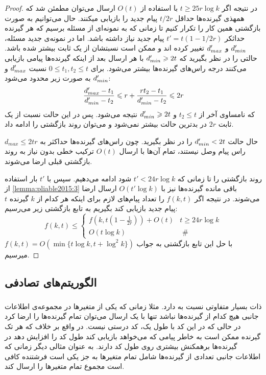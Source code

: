 \begin{proof}
	در نتیجه اگر
	$t \geq 25 r \log k$
	با استفاده از
	$O(t)$
	ارسال می‌توان مطمئن شد که همهذی گیرنده‌ها حداقل
	$t/2r$
	پیام جدید را بازیابی میکنند. حال می‌توانیم به صورت بازگشتی همین کار را تکرار کنیم تا زمانی که به نمونه‌ای از مسئله برسیم که هر گیرنده حداثکر
	$t' = t(1 - 1/2r)$
	پیام جدید نیاز داشته باشد. اما در نمونه‌ی جدید مسئله،
	$d_{min}'$
	و
	$d_{max}'$
	تغییر کرده اند و ممکن است نسبتشان از یک ثابت بیشتر شده باشد. حالتی را در نظر بگیرید که
	$d_{min}' \geqslant 2t$
	با هر ارسال بعد از اینکه گیرنده‌ها پیامی بازیابی می‌کنند درجه راس‌های گیرنده‌ها بیشتر می‌شود. برای
	$0 \leq t_1, t_2 \leq t$
	نسبت
	$d_{max}'$
	و
	$d_{min}'$
	به صورت زیر محدود می‌شود:
	\begin{equation}
		\dfrac{d_{max}' - t_1}{d_{min}' - t_2} \leqslant r + \dfrac{rt_2 - t_1}{d_{min}' - t_2} \leqslant 2r
	\end{equation}
	که نامساوی آخر از 
	$t_2 \leq t$
	و
	$d_{min}' \geqslant 2t$
	نتیجه می‌شود. پس در این حالت نسبت از یک ثابت
	$2r$
	در بدترین حالت بیشتر نمی‌شود و می‌توان روند بازگشتی را ادامه داد.
	
	حال حالت
	$d_{min}' < 2t$
	را در نظر بگیرید. چون راس‌های گیرنده‌ها حداکثر به
	$d_{max} \leq 2tr$
	راس پیام وصل نیستند، تمام آن‌ها با ارسال
	$O(t)$
	ترکیب خطی بدون نیاز به روند بازگشتی قبلی ارضا می‌شوند.
	
	روند بازگشتی را تا زمانی که
	$t' < 24r \log k$
	شود ادامه می‌دهیم. سپس با 
	$t'$
	بار استفاده از 
	\autoref{lemma:pliable2015:3}
	باقی مانده گیرنده‌ها نیز با
	$O(t' \log k)$
	ارسال ارضا می‌شوند. در نتیجه اگر
	$f(k, t)$
	را تعداد پیام‌های لازم برای اینکه هر کدام از
	$k$
	گیرنده
	$t$
	پیام جدید بازیابی کند بگیریم به تابع بازگشتی زیر می‌رسیم:
	\begin{equation}
		f(k, t) \leq \begin{cases}f\left(k, t\left(1-\frac{1}{2 r}\right)\right)+O(t) & t \geq 24 r \log k \\ O(t \log k) & \text { \# }\end{cases}
	\end{equation}
	با حل این تابع بازگشتی به جواب
	$f(k, t) = O(\min\{t \log k, t + \log^2 k\})$
	میرسیم.
\end{proof}

\subsection{
الگوریتم‌های تصادفی
}
\subsubsection{
}
\picod
ذات بسیار متفاوتی نسبت به
\icod
دارد. مثلا زمانی که یکی از متغیرها در مجموعه‌ی اطلاعات جانبی هیچ کدام از گیرنده‌ها نباشد تنها با یک ارسال می‌توان تمام گیرنده‌ها را ارضا کرد در حالی که در
\icod
این کد با طول یک، کد درستی نیست. در واقع بر خلاف
\icod
که هر تک گیرنده ممکن است به خاطر پیامی که می‌خواهد بازیابی کند طول کد را افزایش دهد در
\picod
گیرنده‌ها برهمکنش بیشتری روی طول کد دارند. به عنوان مثالی دیگر زمانی که اطلاعات جانبی تعدادی از گیرنده‌ها شامل تمام متغیرها به جز یکی است فرشتنده کافی است مجموع تمام متغیرها را ارسال کند. 

